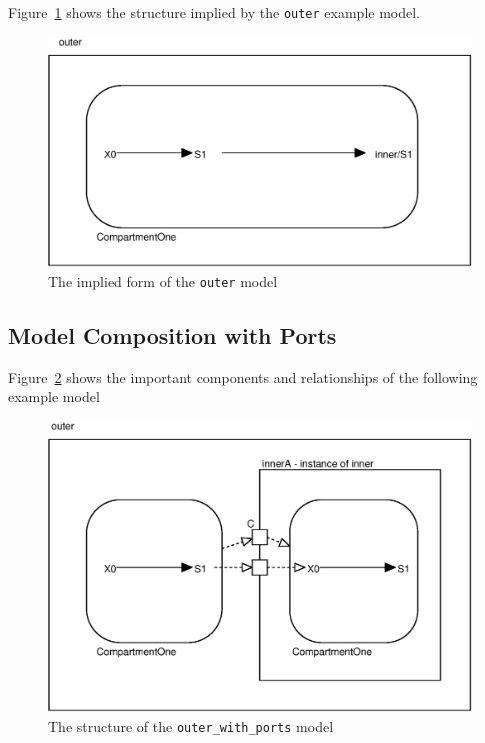 \documentclass{cekarticle}
\begin{document}
Figure~\ref{fig:eg-implied} shows the structure implied by the \texttt{outer} example model.

\begin{figure}[h]
  \vspace*{8pt}
  \centering
  \includegraphics[scale = 0.7]{eg-implied}
  \caption{The implied form of the \texttt{outer} model}
  \label{fig:eg-implied}
\end{figure}

\subsection{Model Composition with Ports}
\label{sec:egwithports}

Figure~\ref{fig:egwithports} shows the important components and relationships of the following example model
\begin{figure}[h]
  \vspace*{8pt}
  \centering
  \includegraphics[scale = 0.7]{egwithports}
  \caption{The structure of the \texttt{outer\_with\_ports} model}
  \label{fig:egwithports}
\end{figure}
\end{document}
